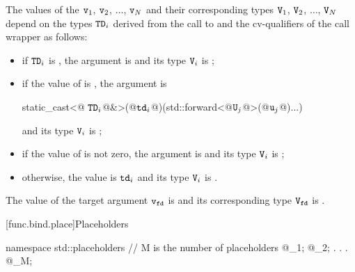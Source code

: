 \pnum
{}%
The values of the  $\texttt{\protect v}_1$, $\texttt{\protect v}_2$, $\dotsc$, $\texttt{\protect v}_N$ and their
corresponding types $\texttt{\protect V}_1$, $\texttt{\protect V}_2$, $\dotsc$, $\texttt{\protect V}_N$ depend on the
types $\texttt{\protect TD}_i$ derived from
the call to  and the
cv-qualifiers \cv{} of the call wrapper  as follows:
\begin{itemize}
\item if $\texttt{\protect TD}_i$ is , the
argument is  and its type $\texttt{\protect V}_i$ is ;

\item if the value of 
is , the argument is
\begin{codeblock}
static_cast<@\cv{} $\texttt{\protect TD}_i$@&>(@$\texttt{\protect td}_i$@)(std::forward<@$\texttt{\protect U}_j$@>(@$\texttt{\protect u}_j$@)...)
\end{codeblock}
and its type $\texttt{\protect V}_i$ is
;

\item if the value  of 
is not zero, the  argument is 
and its type $\texttt{\protect V}_i$
is ;

\item otherwise, the value is $\texttt{\protect td}_i$ and its type $\texttt{\protect V}_i$
is .
\end{itemize}

\pnum
The value of the target argument $\texttt{\protect v}_{\texttt{\protect fd}}$ is  and
its corresponding type $\texttt{\protect V}_{\texttt{\protect fd}}$ is .
%

[func.bind.place]{Placeholders}

%
%
%
%
%
%
%
%
%
%
%
\begin{codeblock}
namespace std::placeholders {
  // M is the number of placeholders
  @\seebelow@ _1;
  @\seebelow@ _2;
              .
              .
              .
  @\seebelow@ _M;
}
\end{codeblock}

